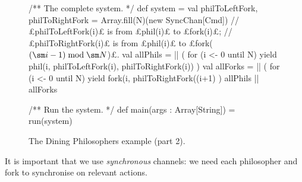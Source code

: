 \begin{figure}
\begin{center}
\def\r{4.07}
\end{center}


\begin{scala}
  /** The complete system. */ 
  def system = {
    val philToLeftFork, philToRightFork = Array.fill(N)(new SyncChan[Cmd])
    // £philToLeftFork(i)£ is from £phil(i)£ to £fork(i)£;
    // £philToRightFork(i)£ is from £phil(i)£ to £fork($(\sm i-1) \bmod \sm N$)£.
    val allPhils = || ( 
      for (i <- 0 until N) yield phil(i, philToLeftFork(i), philToRightFork(i))
    )
    val allForks = || ( 
      for (i <- 0 until N) yield
        fork(i, philToRightFork((i+1)%
    )
    allPhils || allForks
  }

  /** Run the system. */
  def main(args : Array[String]) = run(system)
\end{scala}
\caption{The Dining Philosophers example (part 2).}
\label{fig:dining-philosophers-2}
\end{figure}


It is important that we use \emph{synchronous} channels: we need each
philosopher and fork to synchronise on relevant actions. 

